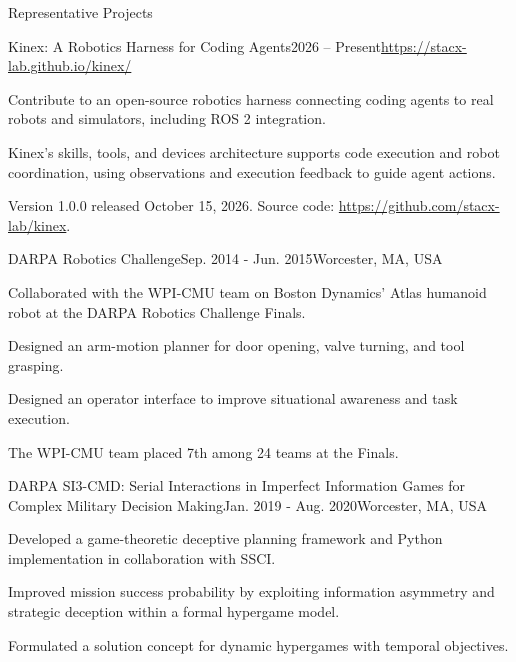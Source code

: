 \documentclass{resume} %
\begin{document}
\begin{rSection}{Representative Projects}

\begin{rSubsection}{Kinex: A Robotics Harness for Coding Agents}{2026 -- Present}{}{\url{https://stacx-lab.github.io/kinex/}}
\item Contribute to an open-source robotics harness connecting coding agents to real robots and simulators, including ROS 2 integration.
\item Kinex's skills, tools, and devices architecture supports code execution and robot coordination, using observations and execution feedback to guide agent actions.
\item Version 1.0.0 released October 15, 2026. Source code: \url{https://github.com/stacx-lab/kinex}.
\end{rSubsection}

\begin{rSubsection}{DARPA Robotics Challenge}{Sep. 2014 - Jun. 2015}{}{Worcester, MA, USA}
\item Collaborated with the WPI-CMU team on Boston Dynamics' Atlas humanoid robot at the DARPA Robotics Challenge Finals.
\item Designed an arm-motion planner for door opening, valve turning, and tool grasping.
\item Designed an operator interface to improve situational awareness and task execution.
\item The WPI-CMU team placed 7th among 24 teams at the Finals.
\end{rSubsection}

\begin{rSubsection}{DARPA SI3-CMD: Serial Interactions in Imperfect Information Games for Complex Military Decision Making}{Jan. 2019 - Aug. 2020}{}{Worcester, MA, USA}
\item Developed a game-theoretic deceptive planning framework and Python implementation in collaboration with SSCI.
\item Improved mission success probability by exploiting information asymmetry and strategic deception within a formal hypergame model.
\item Formulated a solution concept for dynamic hypergames with temporal objectives.
\end{rSubsection}


\end{rSection}
\end{document}
